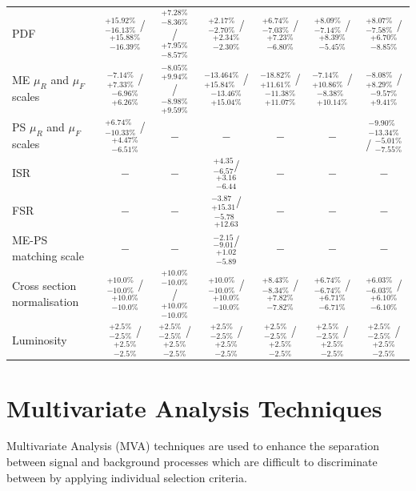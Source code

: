 \begin{table}
\begin{center}
{\begin{tabular}{lcccccc}
PDF             &  $_{-16.13\%}^{+15.92\%}$ /  $_{-16.39\%}^{+15.88\%}$   & $_{-8.36\%}^{+7.28\%}$ / $_{-8.57\%}^{+7.95\%}$  & $_{-2.70\%}^{+2.17\%}$ / $_{-2.30\%}^{+2.34\%}$  & $_{-7.03\%}^{+6.74\%}$ / $_{-6.80\%}^{+7.23\%}$  & $_{-7.14\%}^{+8.09\%}$ / $_{-5.45\%}^{+8.39\%}$ & $_{-7.58\%}^{+8.07\%}$ / $_{-8.85\%}^{+6.70\%}$\\
ME $\mu_{R}$ and $\mu_{F}$ scales             &  $_{+7.33\%}^{-7.14\%}$ /  $_{+6.26\%}^{-6.96\%}$   & $_{+9.94\%}^{-8.05\%}$ / $_{+9.59\%}^{-8.98\%}$  & $_{+15.84\%}^{-13.464\%}$ / $_{+15.04\%}^{-13.46\%}$  & $_{+11.61\%}^{-18.82\%}$ / $_{+11.07\%}^{-11.38\%}$  & $_{+10.86\%}^{-7.14\%}$ / $_{+10.14\%}^{-8.38\%}$ & $_{+8.29\%}^{-8.08\%}$ / $_{+9.41\%}^{-9.57\%}$\\
PS $\mu_{R}$ and $\mu_{F}$ scales             &  $_{-10.33\%}^{+6.74\%}$ /  $_{-6.51\%}^{+4.47\%}$  & $-$  & $-$  & $-$  & $-$ & $_{-13.34\%}^{-9.90\%}$ / $_{-7.55\%}^{-5.01\%}$  \\
ISR             &  $-$   & $-$  & $^{+4.35}_{-6.57}$/$_{-6.44}^{+3.16}$ & $-$  & $-$ & $-$  \\
FSR             &  $-$   & $-$  & $_{+15.31}^{-3.87}$/$^{-5.78}_{+12.63}$ & $-$  & $-$ & $-$  \\ 
ME-PS matching scale             &  $-$   & $-$  & $^{-2.15}_{-9.01}$/$_{-5.89}^{+1.02}$ & $-$  & $-$ & $-$ \\
Cross section normalisation             &  $_{-10.0\%}^{+10.0\%}$ /  $_{-10.0\%}^{+10.0\%}$  & $_{-10.0\%}^{+10.0\%}$  / $_{-10.0\%}^{+10.0\%}$  & $_{-10.0\%}^{+10.0\%}$  / $_{-10.0\%}^{+10.0\%}$  & $_{-8.34\%}^{+8.43\%}$  / $_{-7.82\%}^{+7.82\%}$  & $_{-6.74\%}^{+6.74\%}$  / $_{-6.71\%}^{+6.71\%}$ & $_{-6.03\%}^{+6.03\%}$  / $_{-6.10\%}^{+6.10\%}$ \\    
Luminosity             &  $_{-2.5\%}^{+2.5\%}$ /  $_{-2.5\%}^{+2.5\%}$    & $_{-2.5\%}^{+2.5\%}$  / $_{-2.5\%}^{+2.5\%}$   & $_{-2.5\%}^{+2.5\%}$  / $_{-2.5\%}^{+2.5\%}$   & $_{-2.5\%}^{+2.5\%}$  / $_{-2.5\%}^{+2.5\%}$  & $_{-2.5\%}^{+2.5\%}$  / $_{-2.5\%}^{+2.5\%}$ & $_{-2.5\%}^{+2.5\%}$  / $_{-2.5\%}^{+2.5\%}$ \\    
\hline
\end{tabular}
}
\end{center}
\end{table}

\clearpage
\newpage

\section{Multivariate Analysis Techniques}\label{sec:mvas}
Multivariate Analysis (MVA) techniques are used to enhance the separation between signal and background processes which are difficult to discriminate between by applying individual selection criteria.

